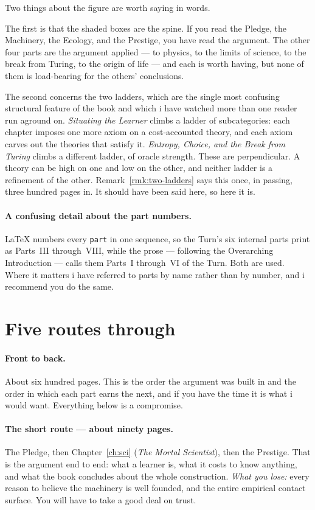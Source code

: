 Two things about the figure are worth saying in words.

The first is that the shaded boxes are the spine.
If you read the Pledge, the Machinery, the Ecology, and the
Prestige, you have read the argument.
The other four parts are the argument applied --- to physics, to
the limits of science, to the break from Turing, to the origin of
life --- and each is worth having, but none of them is load-bearing
for the others' conclusions.

The second concerns the two ladders, which are the single most
confusing structural feature of the book and which i have watched
more than one reader run aground on.
\emph{Situating the Learner} climbs a ladder of subcategories: each
chapter imposes one more axiom on a cost-accounted theory, and each
axiom carves out the theories that satisfy it.
\emph{Entropy, Choice, and the Break from Turing} climbs a
different ladder, of oracle strength.
These are perpendicular.
A theory can be high on one and low on the other, and neither
ladder is a refinement of the other.
Remark~\ref{rmk:two-ladders} says this once, in passing, three
hundred pages in.
It should have been said here, so here it is.

\paragraph{A confusing detail about the part numbers.}
\LaTeX{} numbers every \texttt{part} in one sequence, so the Turn's
six internal parts print as Parts~III through~VIII, while the prose
--- following the Overarching Introduction --- calls them Parts~I
through~VI of the Turn.
Both are used.
Where it matters i have referred to parts by name rather than by
number, and i recommend you do the same.

\section*{Five routes through}

\paragraph{Front to back.}
About six hundred pages.
This is the order the argument was built in and the order in which
each part earns the next, and if you have the time it is what i
would want.
Everything below is a compromise.

\paragraph{The short route --- about ninety pages.}
The Pledge, then Chapter~\ref{ch:sci} (\emph{The Mortal
Scientist}), then the Prestige.
That is the argument end to end: what a learner is, what it costs
to know anything, and what the book concludes about the whole
construction.
\emph{What you lose:} every reason to believe the machinery is well
founded, and the entire empirical contact surface.
You will have to take a good deal on trust.

